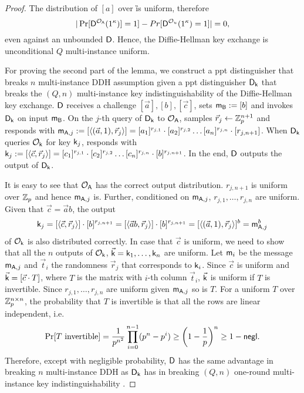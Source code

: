 \begin{proof}
The distribution of $[a]$ over \G is uniform, therefore 
$$
|\Pr[\mathsf D^{\mathcal{O}_{\mathsf{A}}}(1^{\kappa})]=1]-Pr[\mathsf D^{\mathcal{O}_{u}}(1^{\kappa})=1]|=0,
$$
even against an unbounded $\mathsf D$. Hence, the Diffie-Hellman key exchange is unconditional $Q$ multi-instance uniform.

For proving the second part of the lemma, we construct a ppt distinguisher \D that breaks $n$ multi-instance DDH assumption given a ppt distinguisher $\mathsf D_\mathsf{k}$ that breaks the $(Q,n)$ multi-instance key indistinguishability of the Diffie-Hellman key exchange. $\mathsf D$ receives a challenge $[\vec{a}],[b],[\vec{c}]$, sets $\mathsf{m}_{\mathsf{B}}:=[b]$ and invokes $\mathsf D_{\mathsf{k}}$ on input $\mathsf{m}_{\mathsf{B}}$. On the $j$-th query of $\mathsf D_{\mathsf{k}}$ to $\mathcal{O}_{\mathsf{A}}$, \D samples $\vec{r}_j\leftarrow\mathbb Z_p^{n+1}$ and responds with $\mathsf{m}_{\mathsf{A},j}:=[\langle (\vec{a},1),\vec{r}_j\rangle]=[a_1]^{r_{j,1}}\cdot[a_2]^{r_{j,2}}\ldots[a_n]^{r_{j,n}}\cdot[r_{j,n+1}]$. When $\mathsf D_{\mathsf{k}}$ queries $\mathcal{O}_{\mathsf{k}}$ for key $\mathsf{k}_j$, \D responds with $\mathsf{k}_j:=[\langle\vec{c},\vec{r}_j\rangle]=[c_1]^{r_{j,1}}\cdot[c_2]^{r_{j,2}}\ldots[c_n]^{r_{j,n}}\cdot[b]^{r_{j,n+1}}$. In the end, $\mathsf D$ outputs the output of $\mathsf D_{\mathsf{k}}$.

It is easy to see that $\mathcal{O}_{\mathsf{A}}$ has the correct output distribution. $r_{j,n+1}$ is uniform over $\mathbb Z_p$ and hence $\mathsf{m}_{\mathsf{A},j}$ is. Further, conditioned on $\mathsf{m}_{\mathsf{A},j}$, $r_{j,1},\ldots,r_{j,n}$ are uniform. Given that $\vec{c}=\vec{a}b$, the output
$$
\mathsf{k}_j=[\langle\vec{c},\vec{r}_j\rangle]\cdot[b]^{r_{j,n+1}}=[\langle\vec{a}b,\vec{r}_j\rangle]\cdot[b]^{r_{j,n+1}}=[\langle(\vec{a},1),\vec{r}_j\rangle]^b=\mathsf{m}_{\mathsf{A},j}^b
$$
of $\mathcal{O}_{\mathsf{k}}$ is also distributed correctly. In case that $\vec{c}$ is uniform, we need to show that all the $n$ outputs of $\mathcal{O}_{\mathsf{k}}$, $\vec{\mathsf{k}}=\mathsf{k}_1,\ldots,\mathsf{k}_n$ are uniform. Let $\mathsf{m}_i$ be the message $\mathsf{m}_{\mathsf{A},j}$ and $\vec{t}_i$ the randomness $\vec{r}_j$ that corresponds to $\mathsf{k}_i$. Since $\vec{c}$ is uniform and $\vec{\mathsf{k}}=[\vec{c}\cdot T]$, where $T$ is the matrix with $i$-th column $\vec{t}_i$, $\vec{\mathsf{k}}$ is uniform if $T$ is invertible. Since $r_{j,1},\ldots,r_{j,n}$ are uniform given $\mathsf{m}_{\mathsf{A},j}$ so is $T$. For a uniform $T$ over $\mathbb Z_p^{n\times n}$, the probability that $T$ is invertible is that all the rows are linear independent, i.e. 
$$
\Pr[T\text{ invertible}]= \frac{1}{p^{n^2}}\prod_{i=0}^{n-1}(p^n-p^i)\geq\left(1-\frac{1}{p}\right)^n\geq 1-\mathsf{negl}.
$$ 
Therefore, except with negligible probability, $\mathsf D$ has the same advantage in breaking $n$ multi-instance DDH as $\mathsf D_{\mathsf{k}}$ has in breaking $(Q,n)$ one-round multi-instance key indistinguishability .
\end{proof}

